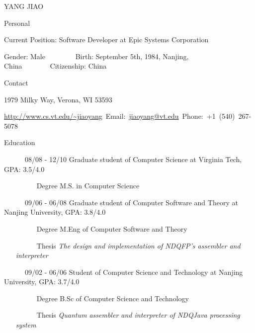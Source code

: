 \documentclass{article}
\begin{document}
\begin{cv}{YANG JIAO}
\begin{cvlist}{Personal}
\item Current Position: Software Developer at Epic Systems Corporation
\item Gender: Male ~~~~~~~~Birth: September 5th, 1984, Nanjing, China~~~~~~~~Citizenship: China
\end{cvlist}
\begin{cvlist}{Contact}
\item 1979 Milky Way, Verona, WI 53593  
\item \url{http://www.cs.vt.edu/~jiaoyang}~Email:~\url{jiaoyang@vt.edu}~Phone:~+1~(540)~267-5078
\end{cvlist}
\begin{cvlist}{Education}
\item [~~~~~~08/08 - 12/10] Graduate student of Computer Science at Virginia Tech, GPA: 3.5/4.0
\begin{itemize}
\item [~~~~~~Degree] M.S. in Computer Science 
\end{itemize}
\item [~~~~~~09/06 - 06/08] Graduate student of Computer Software and Theory at Nanjing University, GPA: 3.8/4.0
\begin{itemize}
\item [~~~~~~Degree] M.Eng of Computer Software and Theory
\item [~~~~~~Thesis] {\em The design and implementation of NDQFP's assembler and interpreter}
\end{itemize}
\item [~~~~~~09/02 - 06/06] Student of Computer Science and Technology at Nanjing University, GPA: 3.7/4.0
\begin{itemize}
\item [~~~~~~Degree] B.Sc of Computer Science and Technology
\item [~~~~~~Thesis] {\em Quantum assembler and interpreter of NDQJava processing system}
\end{itemize}
\end{cvlist}


\end{cv}
\end{document}
